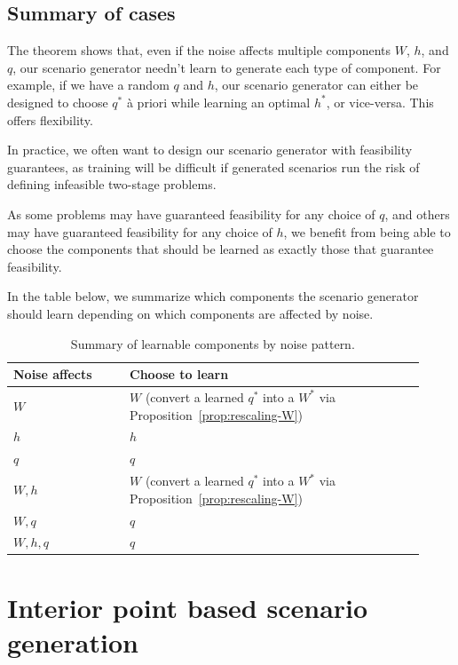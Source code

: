 \documentclass{article}
\theoremstyle{plain}
\theoremstyle{definition}
\theoremstyle{remark}
\begin{document}
\subsection{Summary of cases}
\label{sec:cases-table}
The theorem shows that, even if the noise affects multiple components $W$, $h$, and $q$, our scenario generator needn't learn to generate each type of component. For example, if we have a random $q$ and $h$, our scenario generator can either be designed to choose $q^*$ \`a priori while learning an optimal $h^*$, or vice-versa. This offers flexibility.

In practice, we often want to design our scenario generator with feasibility guarantees, as training will be difficult if generated scenarios run the risk of defining infeasible two-stage problems.

As some problems may have guaranteed feasibility for any choice of $q$, and others may have guaranteed feasibility for any choice of $h$, we benefit from being able to choose the components that should be learned as exactly those that guarantee feasibility.

In the table below, we summarize which components the scenario generator should learn depending on which components are affected by noise.

\begin{table}[H]
  \centering
  \caption{Summary of learnable components by noise pattern.}
  \label{tab:cases}
  \begin{tabular}{p{0.26\linewidth} p{0.66\linewidth}}
    \toprule
    Noise affects & Choose to learn \\
    \midrule
    $W$ & $W$ (convert a learned $q^*$ into a $W^*$ via Proposition~\ref{prop:rescaling-W}) \\
    $h$ & $h$ \\
    $q$ & $q$ \\
    $W,h$ & $W$ (convert a learned $q^*$ into a $W^*$ via Proposition~\ref{prop:rescaling-W}) \\
    $W,q$ & $q$ \\
    $W,h,q$ & $q$ \\
    \bottomrule
  \end{tabular}
\end{table}

\section{Interior point based scenario generation}
\label{sec:ip-scenarios}
\end{document}
